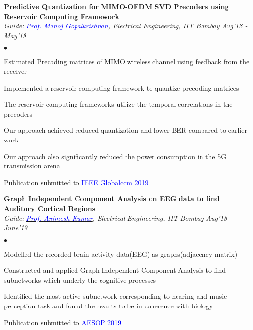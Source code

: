 \documentclass[margin,line, 9pt]{res}
\newenvironment{list2}{
  \begin{list}{$\bullet$}{%
      \setlength{\itemsep}{0.03in}
      \setlength{\parsep}{0in} \setlength{\parskip}{0in}
      \setlength{\topsep}{0in} \setlength{\partopsep}{0in} 
      \setlength{\leftmargin}{0.2in}}}{\end{list}}
\begin{document}
\begin{resume}
{\bf Predictive Quantization for MIMO-OFDM SVD Precoders using Reservoir Computing Framework} \\
{\em Guide: \href{https://www.ee.iitb.ac.in/web/people/faculty/home/manojg}{\textcolor{blue}{Prof. Manoj Gopalkrishnan}}, Electrical Engineering, IIT Bombay} \hfill {\it Aug'18 - May'19}\\
\vspace*{-.13in}
\begin{list2}
\item Estimated Precoding matrices of MIMO wireless channel using feedback from the receiver
\item Implemented a reservoir computing framework to quantize precoding matrices
\item The reservoir computing frameworks utilize the temporal correlations in the precoders
\item Our approach achieved reduced quantization and lower BER compared to earlier work
\item Our approach also significantly reduced the power consumption in the 5G transmission arena
\item Publication submitted to \href{https://globecom2019.ieee-globecom.org}{\textcolor{blue} {IEEE Globalcom 2019}}
\end{list2}


{\bf Graph Independent Component Analysis on EEG data to find Auditory Cortical Regions} \\
{\em Guide: \href{https://www.ee.iitb.ac.in/~animesh/}{\textcolor{blue}{Prof. Animesh Kumar}}, Electrical Engineering, IIT Bombay} \hfill {\it Aug'18 - June'19}\\
\vspace*{-.13in}
\begin{list2}
\item Modelled the recorded brain activity data(EEG) as graphs(adjacency matrix)
\item Constructed and applied Graph Independent Component Analysis to find subnetworks which underly the cognitive processes
\item Identified the most active subnetwork corresponding to hearing and music perception task and found the results to be in coherence with biology
\item Publication submitted to \href{https://gbiomed.kuleuven.be/english/research/50000666/50000672/Symposia/aesop/AESOP2019}{\textcolor{blue} {AESOP 2019}}
\end{list2}


\end{resume}
\end{document}

